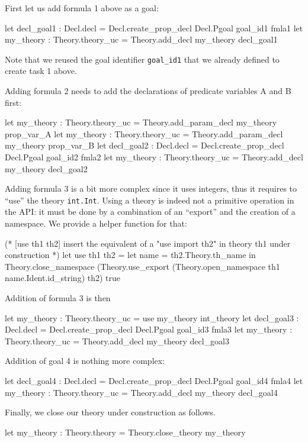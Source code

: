 First let us add formula 1 above as a goal:
\begin{ocamlcode}
let decl_goal1 : Decl.decl =
  Decl.create_prop_decl Decl.Pgoal goal_id1 fmla1
let my_theory : Theory.theory_uc =
  Theory.add_decl my_theory decl_goal1
\end{ocamlcode}
Note that we reused the goal identifier \verb|goal_id1| that we
already defined to create task 1 above.

Adding formula 2 needs to add the declarations of predicate variables A
and B first:
\begin{ocamlcode}
let my_theory : Theory.theory_uc =
  Theory.add_param_decl my_theory prop_var_A
let my_theory : Theory.theory_uc =
  Theory.add_param_decl my_theory prop_var_B
let decl_goal2 : Decl.decl =
  Decl.create_prop_decl Decl.Pgoal goal_id2 fmla2
let my_theory : Theory.theory_uc = Theory.add_decl my_theory decl_goal2
\end{ocamlcode}

Adding formula 3 is a bit more complex since it uses integers, thus it
requires to ``use'' the theory \verb|int.Int|. Using a theory is
indeed not a primitive operation in the API: it must be done by a
combination of an ``export'' and the creation of a namespace. We
provide a helper function for that:
\begin{ocamlcode}
(* [use th1 th2] insert the equivalent of a "use import th2" in
  theory th1 under construction *)
let use th1 th2 =
  let name = th2.Theory.th_name in
  Theory.close_namespace
    (Theory.use_export
      (Theory.open_namespace th1 name.Ident.id_string) th2) true
\end{ocamlcode}
Addition of formula 3 is then
\begin{ocamlcode}
let my_theory : Theory.theory_uc = use my_theory int_theory
let decl_goal3 : Decl.decl =
  Decl.create_prop_decl Decl.Pgoal goal_id3 fmla3
let my_theory : Theory.theory_uc =
  Theory.add_decl my_theory decl_goal3
\end{ocamlcode}

Addition of goal 4 is nothing more complex:
\begin{ocamlcode}
let decl_goal4 : Decl.decl =
  Decl.create_prop_decl Decl.Pgoal goal_id4 fmla4
let my_theory :
  Theory.theory_uc = Theory.add_decl my_theory decl_goal4
\end{ocamlcode}

Finally, we close our theory under construction as follows.
\begin{ocamlcode}
let my_theory : Theory.theory = Theory.close_theory my_theory
\end{ocamlcode}

